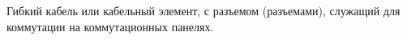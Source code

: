 Гибкий кабель или кабельный элемент, с разъемом (разъемами),
служащий для коммутации на коммутационных панелях.